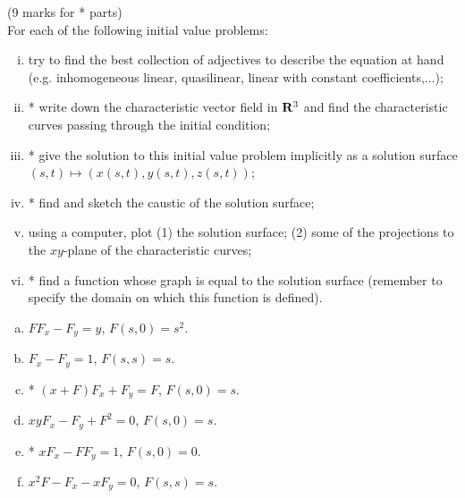 \documentclass[12pt]{article}
\begin{document}
\bigskip

\begin{question}(9 marks for * parts)\\
 For each of the following initial value problems:
\begin{enumerate}[(i)]
\item try to find the best collection of adjectives to describe the equation at hand (e.g. inhomogeneous linear, quasilinear, linear with constant coefficients,...);
\item * write down the characteristic vector field in $\mathbf{R}^3$ and find the characteristic curves passing through the initial condition;
\item * give the solution to this initial value problem implicitly as a solution surface $(s,t)\mapsto (x(s,t),y(s,t),z(s,t))$;
\item * find and sketch the caustic of the solution surface;
\item using a computer, plot (1) the solution surface; (2) some of the projections to the $xy$-plane of the characteristic curves;
\item * find a function whose graph is equal to the solution surface (remember to specify the domain on which this function is defined).
\end{enumerate}

\begin{multicols}{2}
\begin{enumerate}[(a)]
\item $FF_x-F_y=y$, $F(s,0)=s^2$.
\item $F_x-F_y=1$, $F(s,s)=s$.
\item * $(x+F)F_x+F_y=F$, $F(s,0)=s$.
\item $xyF_x-F_y+F^2=0$, $F(s,0)=s$.
\item * $xF_x-FF_y=1$, $F(s,0)=0$.
\item $x^2F-F_x-xF_y=0$, $F(s,s)=s$.
\end{enumerate}
\end{multicols}

\end{question}
\end{document}
